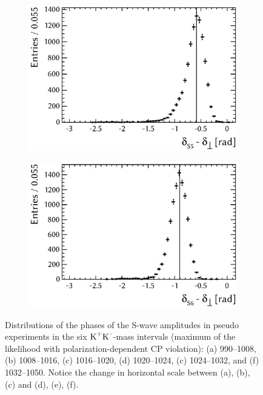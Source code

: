 \begin{figure}[tbp]
  \vspace*{0.02\textwidth}
  \begin{subfigure}{0.49\textwidth}
    \includegraphics[width=\textwidth]{graphics/results/parDist_polarDep_ASOddPhase_bin4}
    \caption{}
  \end{subfigure}
  \hfill%
  \begin{subfigure}{0.49\textwidth}
    \includegraphics[width=\textwidth]{graphics/results/parDist_polarDep_ASOddPhase_bin5}
    \caption{}
  \end{subfigure}

  \caption{Distributions of the phases of the S-wave amplitudes in pseudo experiments in the six $\text{K}^\text{+}\text{K}^\text{--}$-mass intervals
           (maximum of the likelihood with polarization-dependent CP violation):
           (a) 990--1008\unitsp\MeV, (b) 1008--1016\unitsp\MeV, (c) 1016--1020\unitsp\MeV,
           (d) 1020--1024\unitsp\MeV, (c) 1024--1032\unitsp\MeV, and (f) 1032--1050\unitsp\MeV.
           Notice the change in horizontal scale between (a), (b), (c) and (d), (e), (f).}
  \label{fig:parDists_SWavePhases}
\end{figure}

